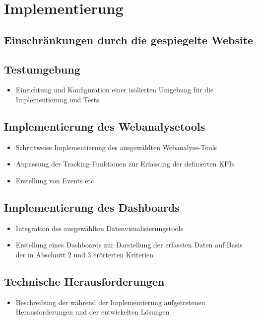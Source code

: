 \chapter{Implementierung}
\label{ch:implementierung}

\section{Einschränkungen durch die gespiegelte Website}
\label{sec:einschränkungen }

\section{Testumgebung}
\begin{itemize}
    \item Einrichtung und Konfiguration einer isolierten Umgebung für die Implementierung und Tests.
\end{itemize}

\section{Implementierung des Webanalysetools}
\begin{itemize}
    \item Schrittweise Implementierung des ausgewählten Webanalyse-Tools
    \item Anpassung der Tracking-Funktionen zur Erfassung der definierten KPIs
    \item Erstellung von Events etc
\end{itemize}

\section{Implementierung des Dashboards}
\begin{itemize}
    \item Integration des ausgewählten Datenvisualisierungstools
    \item Erstellung eines Dashboards zur Darstellung der erfassten Daten auf Basis der in Abschnitt 2 und 3 erörterten Kriterien
\end{itemize}

\section{Technische Herausforderungen}
\begin{itemize}
    \item Beschreibung der während der Implementierung aufgetretenen Herausforderungen und der entwickelten Lösungen
\end{itemize}